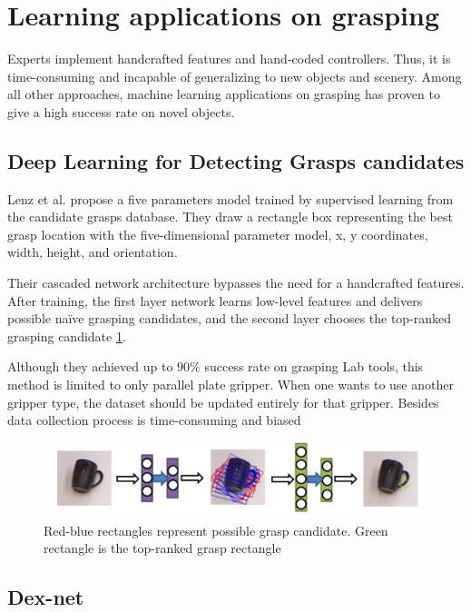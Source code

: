 \section{Learning applications on grasping}

Experts implement handcrafted features and hand-coded controllers. Thus, it is time-consuming and incapable of generalizing to new objects and scenery. Among all other approaches, machine learning applications on grasping has proven to give a high success rate on novel objects.


\subsection{Deep Learning for Detecting Grasps candidates}
Lenz et al. propose a five parameters model trained by supervised learning from the candidate grasps database. They draw a rectangle box representing the best grasp location with the five-dimensional parameter model, x, y coordinates, width, height, and orientation.

Their cascaded network architecture bypasses the need for a handcrafted features. After training, the first layer network learns low-level features and delivers possible naïve grasping candidates, and the second layer chooses the top-ranked grasping candidate \ref{fig:deeplearngrasp}.

Although they achieved up to \(90\%\) success rate on grasping Lab tools, this method is limited to only parallel plate gripper. When one wants to use another gripper type, the dataset should be updated entirely for that gripper. Besides data collection process is time-consuming and biased

\begin{figure}[htbp]
    \centering
    \includegraphics[width=1.\textwidth]{figures/DeepLearningGrasp}
    \caption{Red-blue rectangles represent possible grasp candidate. Green rectangle is the top-ranked grasp rectangle \cite{Lenz2013}}
    \label{fig:deeplearngrasp}
\end{figure}

\subsection{Dex-net}

